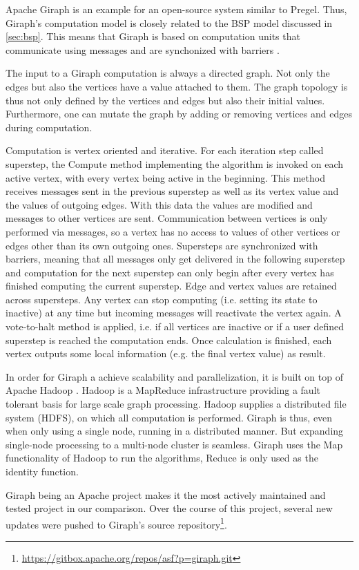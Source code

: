 

Apache Giraph is an example for an open-source system similar to Pregel.
Thus, Giraph's computation model is closely related to the BSP model discussed in \autoref{sec:bsp}. 
This means that Giraph is based on computation units that communicate using messages and are synchonized with barriers \cite{Giraph}.

The input to a Giraph computation is always a directed graph. Not only the edges but also the vertices have a value attached to them. The graph topology is thus not only defined by the vertices and edges but also their initial values.
Furthermore, one can mutate the graph by adding or removing vertices and edges during computation.

Computation is vertex oriented and iterative.
For each iteration step called superstep, the Compute method implementing the algorithm is invoked on each active vertex, with every vertex being active in the beginning.
This method receives messages sent in the previous superstep as well as its vertex value and the values of outgoing edges.
With this data the values are modified and messages to other vertices are sent.
Communication between vertices is only performed via messages, so a vertex has no access to values of other vertices or edges other than its own outgoing ones.
Supersteps are synchronized with barriers, meaning that all messages only get delivered in the following superstep and computation for the next superstep can only begin after every vertex has finished computing the current superstep.
Edge and vertex values are retained across supersteps.
Any vertex can stop computing (i.e. setting its state to inactive) at any time but incoming messages will reactivate the vertex again.
A vote-to-halt method is applied, i.e. if all vertices are inactive or if a user defined superstep is reached the computation ends.
Once calculation is finished, each vertex outputs some local information (e.g. the final vertex value) as result.

In order for Giraph a achieve scalability and parallelization, it is built on top of Apache Hadoop \cite{Giraph}.
Hadoop is a MapReduce infrastructure providing a fault tolerant basis for large scale graph processing.
Hadoop supplies a distributed file system (HDFS), on which all computation is performed.
Giraph is thus, even when only using a single node, running in a distributed manner.
But expanding single-node processing to a multi-node cluster is seamless.
Giraph uses the Map functionality of Hadoop to run the algorithms, Reduce is only used as the identity function.

Giraph being an Apache project makes it the most actively maintained and tested project in our comparison. Over the course of this project, several new updates were pushed to Giraph's source repository\footnote{\url{https://gitbox.apache.org/repos/asf?p=giraph.git}}.
